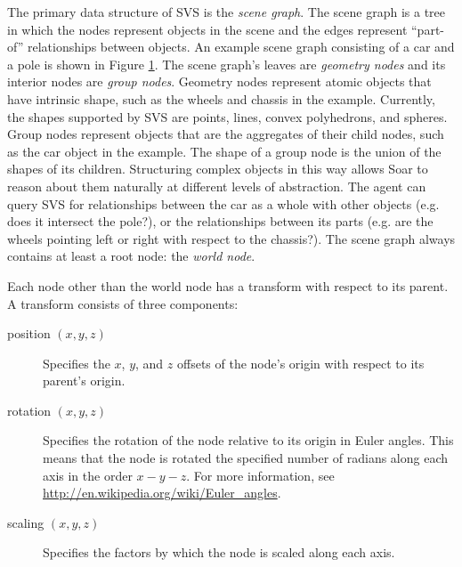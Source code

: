 The primary data structure of SVS is the \emph{scene graph}.
The scene graph is a tree in which the nodes represent objects in the scene and the edges represent ``part-of'' relationships between objects.
An example scene graph consisting of a car and a pole is shown in Figure \ref{fig:scene-graph}.
The scene graph's leaves are \emph{geometry nodes} and its interior nodes are \emph{group nodes}.
Geometry nodes represent atomic objects that have intrinsic shape, such as the wheels and chassis in the example.
Currently, the shapes supported by SVS are points, lines, convex polyhedrons, and spheres.
Group nodes represent objects that are the aggregates of their child nodes, such as the car object in the example.
The shape of a group node is the union of the shapes of its children.
Structuring complex objects in this way allows Soar to reason about them naturally at different levels of abstraction.
The agent can query SVS for relationships between the car as a whole with other objects (e.g. does it intersect the pole?), or the relationships between its parts (e.g. are the wheels pointing left or right with respect to the chassis?).
The scene graph always contains at least a root node: the \emph{world node}.

\begin{figure}
\label{fig:scene-graph}
\end{figure}

Each node other than the world node has a transform with respect to its parent.
A transform consists of three components:

\begin{description}
\item[position $(x,y,z)$]
Specifies the $x$, $y$, and $z$ offsets of the node's origin with respect to its parent's origin.

\item[rotation $(x,y,z)$]
Specifies the rotation of the node relative to its origin in Euler angles.
This means that the node is rotated the specified number of radians along each axis in the order $x-y-z$.
For more information, see \url{http://en.wikipedia.org/wiki/Euler_angles}.

\item[scaling $(x,y,z)$]
Specifies the factors by which the node is scaled along each axis.

\end{description}


